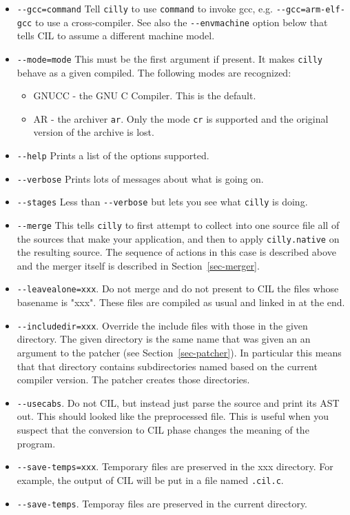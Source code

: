 \documentclass[letterpaper]{article}
\def\secref#1{Section~\ref{sec-#1}}
\def\t#1{{\tt #1}}
\begin{document}
\begin{itemize}
\item \t{-{}-gcc=command} Tell \t{cilly} to use \t{command} to invoke
  gcc, e.g.  \t{-{}-gcc=arm-elf-gcc} to use a cross-compiler. See also
  the \t{-{}-envmachine} option below that tells CIL to assume a
  different machine model.
\item \t{-{}-mode=mode} This must be the first argument if present. It makes
\t{cilly} behave as a given compiled. The following modes are recognized:
     \begin{itemize}
        \item GNUCC - the GNU C Compiler. This is the default.
        \item AR - the archiver \t{ar}. Only the mode \t{cr} is supported and
                   the original version of the archive is lost.
     \end{itemize}
\item \t{-{}-help} Prints a list of the options supported.
\item \t{-{}-verbose} Prints lots of messages about what is going on.
\item \t{-{}-stages} Less than \t{-{}-verbose} but lets you see what \t{cilly}
                   is doing.
\item \t{-{}-merge} This tells \t{cilly} to first attempt to collect into one
source file all of the sources that make your application, and then to apply
\t{cilly.native} on the resulting source. The sequence of actions in this case is
described above and the merger itself is described in \secref{merger}.

\item \t{-{}-leavealone=xxx}. Do not merge and do not present to CIL the files
whose basename is "xxx". These files are compiled as usual and linked in at
the end.
\item \t{-{}-includedir=xxx}. Override the include files with those in the given
directory. The given directory is the same name that was given an an argument
to the patcher (see \secref{patcher}). In particular this means that
that directory contains subdirectories named based on the current compiler
version. The patcher creates those directories.
\item \t{-{}-usecabs}. Do not CIL, but instead just parse the source and print
its AST out. This should looked like the preprocessed file. This is useful
when you suspect that the conversion to CIL phase changes the meaning of the
program.
\item \t{-{}-save-temps=xxx}. Temporary files are preserved in the xxx
  directory.  For example, the output of CIL will be put in a file
  named \t{*.cil.c}.
\item \t{-{}-save-temps}. Temporay files are preserved in the current directory.
\end{itemize}
\end{document}
